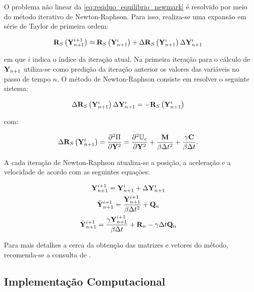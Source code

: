 O problema não linear da \autoref{eq:residuo_equilibrio_newmark} é resolvido por meio do método iterativo de Newton-Raphson. Para isso, realiza-se uma expansão em série de Taylor de primeira ordem:

\begin{gather}
\mathbf{R}_S\left(\mathbf{Y}_{n+1}^{i+1}\right) \approx \mathbf{R}_S\left(\mathbf{Y}_{n+1}^{i}\right) + \Delta\mathbf{R}_S\left(\mathbf{Y}_{n+1}^{i}\right)\Delta\mathbf{Y}_{n+1}^{i} 
\end{gather}

\noindent em que $i$ indica o índice da iteração atual. Na primeira iteração para o cálculo de $\mathbf{Y}_{n+1}$ utiliza-se como predição da iteração anterior os valores das variáveis no passo de tempo $n$. O método de Newton-Raphson consiste em resolver o seguinte sistema:

\begin{gather}
\Delta\mathbf{R}_S\left(\mathbf{Y}_{n+1}^{i}\right)\Delta\mathbf{Y}_{n+1}^{i} = -\mathbf{R}_S\left(\mathbf{Y}_{n+1}^{i}\right) \label{eq:NR}
\end{gather}

\noindent com:

\begin{gather}
\Delta\mathbf{R}_S\left(\mathbf{Y}_{n+1}^{i}\right) = \frac{\partial^{2}\Pi}{\partial\mathbf{Y}^{2}} = \frac{\partial^{2}\mathbb{U}_e}{\partial \mathbf{Y}^{2}} + \frac{\mathbf{M}}{\beta \Delta t^2} + \frac{\gamma \mathbf{C}}{\beta \Delta t}.
\end{gather}

A cada iteração de Newton-Raphson atualiza-se a posição, a aceleração e a velocidade de acordo com as seguintes equações:

\begin{gather}
\mathbf{Y}_{n+1}^{i+1} = \mathbf{Y}_{n+1}^{i} + \Delta\mathbf{Y}_{n+1}^{i} \label{UD1}\\
\ddot{\mathbf{Y}}_{n+1}^{i+1} = \frac{\mathbf{Y}_{n+1}^{i+1}}{\beta \Delta t^2} + \mathbf{Q}_n  \label{UD2} \\
\dot{\mathbf{Y}}_{n+1}^{i+1} = \frac{\gamma \mathbf{Y}_{n+1}^{i+1}}{\beta \Delta t} + \mathbf{R}_n - \gamma\Delta t \mathbf{Q}_n  \label{UD3}
\end{gather}

Para mais detalhes a cerca da obtenção das matrizes e vetores do método, recomenda-se a consulta de .

\subsection{Implementação Computacional}

